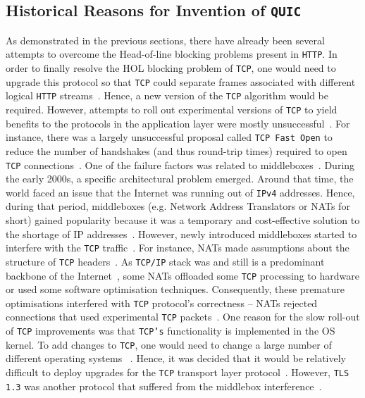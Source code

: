 \documentclass[12pt,a4paper,twoside,openright]{report}
\begin{document}
\subsection{Historical Reasons for Invention of \texttt{QUIC}}
As demonstrated in the previous sections, there have already been several attempts to overcome the Head-of-line blocking problems present in \texttt{HTTP}.
In order to finally resolve the HOL blocking problem of \texttt{TCP}, one would need to upgrade this protocol so that \texttt{TCP} could separate frames associated with different logical \texttt{HTTP} streams~\cite{head-of-line-blocking-in-quic-and-http-3-the-details}.
Hence, a new version of the \texttt{TCP} algorithm would be required. 
However, attempts to roll out experimental versions of \texttt{TCP} to yield benefits to the protocols in the application layer were mostly unsuccessful~\cite{bib_Netdev_0x13_QUIC_Tutorial, PollardBarry2019HiAP}.
For instance, there was a largely unsuccessful proposal called \texttt{TCP Fast Open} to reduce the number of handshakes (and thus round-trip times) required to open \texttt{TCP} connections~\cite{the-sad-story-of-tcp-fast-open}.
One of the failure factors was related to middleboxes~\cite{the-sad-story-of-tcp-fast-open}.
During the early 2000s, a specific architectural problem emerged.
Around that time, the world faced an issue that the Internet was running out of \texttt{IPv4} addresses.
Hence, during that period, middleboxes (e.g. Network Address Translators or NATs for short) gained popularity because it was a temporary and cost-effective solution to the shortage of IP addresses~\cite{MurphyNiallRichard2005Ina, bib_Netdev_0x13_QUIC_Tutorial}.
However, newly introduced middleboxes started to interfere with the \texttt{TCP} traffic~\cite{bib_Netdev_0x13_QUIC_Tutorial, PollardBarry2019HiAP}.
For instance, NATs made assumptions about the structure of \texttt{TCP} headers~\cite{bib_Netdev_0x13_QUIC_Tutorial, PollardBarry2019HiAP}.
As \texttt{TCP/IP} stack was and still is a predominant backbone of the Internet~\cite{tcp-ip-stack_shtml}, some NATs offloaded some \texttt{TCP} processing to hardware or used some software optimisation techniques.
Consequently, these premature optimisations interfered with \texttt{TCP} protocol's correctness -- NATs rejected connections that used experimental \texttt{TCP} packets~\cite{PollardBarry2019HiAP}.
One reason for the slow roll-out of \texttt{TCP} improvements was that \texttt{TCP's} functionality is implemented in the OS kernel.
To add changes to \texttt{TCP}, one would need to change a large number of different operating systems ~\cite{PollardBarry2019HiAP}.
Hence, it was decided that it would be relatively difficult to deploy upgrades for the \texttt{TCP} transport layer protocol~\cite{head-of-line-blocking-in-quic-and-http-3-the-details}.
However, \texttt{TLS 1.3} was another protocol that suffered from the middlebox interference~\cite{why-tls-1-3-isnt-in-browsers-yet}.
\end{document}
